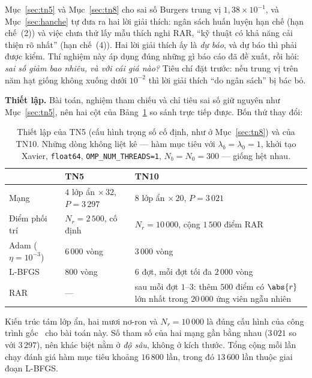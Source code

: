 \begin{thinghiem}
\label{tn:tangcuong}
Mục~\ref{sec:tn5} và Mục~\ref{sec:tn8} cho sai số Burgers trung vị
$1{,}38\times10^{-1}$, và Mục~\ref{sec:hanche} tự đưa ra hai lời giải thích: ngân
sách huấn luyện hạn chế (hạn chế~(2)) và việc chưa thử lấy mẫu thích nghi RAR,
``kỹ thuật có khả năng cải thiện rõ nhất'' (hạn chế~(4)). Hai lời giải thích ấy
là \emph{dự báo}, và dự báo thì phải được kiểm. Thí nghiệm này áp dụng đúng
những gì báo cáo đã đề xuất, rồi hỏi: \emph{sai số giảm bao nhiêu, và với cái giá
nào?} Tiêu chí đặt trước: nếu trung vị trên năm hạt giống không xuống dưới
$10^{-2}$ thì lời giải thích ``do ngân sách'' bị bác bỏ.
\end{thinghiem}

\textbf{Thiết lập.} Bài toán, nghiệm tham chiếu và chỉ tiêu sai số giữ nguyên
như Mục~\ref{sec:tn5}, nên hai cột của Bảng~\ref{tab:tn10-thietlap} so sánh trực
tiếp được. Bốn thứ thay đổi:

\begin{table}[H]
\centering
\caption[Thiết lập TN5 so với TN10]{Thiết lập của TN5 (cấu hình trọng số cố
định, như ở Mục~\ref{sec:tn8}) và của TN10. Những dòng không liệt kê --- hàm mục
tiêu với $\lambda_b = \lambda_0 = 1$, khởi tạo Xavier, \texttt{float64},
\texttt{OMP\_NUM\_THREADS=1}, $N_b = N_0 = 300$ --- giống hệt nhau.}
\label{tab:tn10-thietlap}
\small
\begin{tabular}{@{}l l p{6.2cm}@{}}
\toprule
& \textbf{TN5} & \textbf{TN10} \\
\midrule
Mạng & $4$ lớp ẩn $\times\,32$, $P = 3\,297$
  & $8$ lớp ẩn $\times\,20$, $P = 3\,021$ \\
Điểm phối trí & $N_r = 2\,500$, cố định
  & $N_r = 10\,000$, cộng $1\,500$ điểm RAR \\
Adam ($\eta = 10^{-3}$) & $6\,000$ vòng & $3\,000$ vòng \\
L-BFGS & $800$ vòng & $6$ đợt, mỗi đợt tối đa $2\,000$ vòng \\
RAR & --- & sau mỗi đợt $1$--$3$: thêm $500$ điểm có $\abs{r}$ lớn nhất
  trong $20\,000$ ứng viên ngẫu nhiên \\
\bottomrule
\end{tabular}
\end{table}

Kiến trúc tám lớp ẩn, hai mươi nơ-ron và $N_r = 10\,000$ là đúng cấu hình của
công trình gốc~\cite{raissi2019} cho bài toán này. Số tham số của hai mạng gần
bằng nhau ($3\,021$ so với $3\,297$), nên khác biệt nằm ở \emph{độ sâu}, không ở
kích thước. Tổng cộng mỗi lần chạy đánh giá hàm mục tiêu khoảng $16\,800$ lần,
trong đó $13\,600$ lần thuộc giai đoạn L-BFGS.

